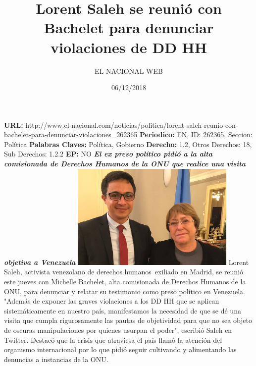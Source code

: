 \documentclass{article}%
\title{\textbf{Lorent Saleh se reunió con Bachelet para denunciar violaciones de DD HH}}%
\author{EL NACIONAL WEB}%
\date{06/12/2018}%
\begin{document}
%
\normalsize%
\maketitle%
\textbf{URL: }%
http://www.el{-}nacional.com/noticias/politica/lorent{-}saleh{-}reunio{-}con{-}bachelet{-}para{-}denunciar{-}violaciones\_262365\newline%
%
\textbf{Periodico: }%
EN, %
ID: %
262365, %
Seccion: %
Política\newline%
%
\textbf{Palabras Claves: }%
Política, Gobierno\newline%
%
\textbf{Derecho: }%
1.2, %
Otros Derechos: %
18, %
Sub Derechos: %
1.2.2\newline%
%
\textbf{EP: }%
NO\newline%
\newline%
%
\textbf{\textit{El ex preso político pidió a la alta comisionada de Derechos Humanos de la ONU que realice una visita objetiva a Venezuela}}%
\newline%
\newline%
%
\includegraphics[width=300px]{148.jpg}%
\newline%
%
Lorent Saleh, activista venezolano de derechos humanos~exiliado en Madrid, se reunió este jueves con Michelle Bachelet, alta comisionada de Derechos Humanos de la ONU, para denunciar y relatar su testimonio como preso político en Venezuela.%
\newline%
%
"Además de exponer las graves violaciones a los DD HH que se aplican sistemáticamente en nuestro país, manifestamos la necesidad de que se dé una visita que cumpla rigurosamente las pautas de objetividad para que no sea objeto de oscuras manipulaciones por quienes usurpan el poder", escribió Saleh en Twitter.%
\newline%
%
Destacó que la crisis que atraviesa el país llamó la atención del organismo internacional por lo que pidió seguir cultivando y alimentando las denuncias a instancias de la ONU.%
\newline%
%
\end{document}
